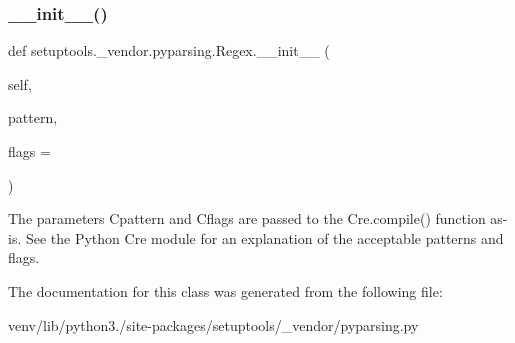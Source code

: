\subsubsection{\texorpdfstring{\+\_\+\+\_\+init\+\_\+\+\_\+()}{\_\_init\_\_()}}
{\footnotesize\ttfamily def setuptools.\+\_\+vendor.\+pyparsing.\+Regex.\+\_\+\+\_\+init\+\_\+\+\_\+ (\begin{DoxyParamCaption}\item[{}]{self,  }\item[{}]{pattern,  }\item[{}]{flags = {} }\end{DoxyParamCaption})}

\begin{DoxyVerb}The parameters C{pattern} and C{flags} are passed to the C{re.compile()} function as-is. See the Python C{re} module for an explanation of the acceptable patterns and flags.\end{DoxyVerb}
 

The documentation for this class was generated from the following file\+:\begin{DoxyCompactItemize}
\item 
venv/lib/python3./site-\/packages/setuptools/\+\_\+vendor/pyparsing.\+py\end{DoxyCompactItemize}

